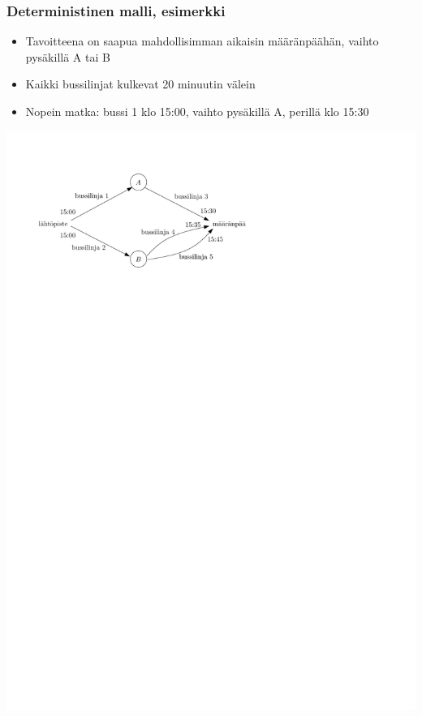 \documentclass{beamer}
\begin{document}
\begin{frame}
  \frametitle{Deterministinen malli, esimerkki} 
  \begin{minipage}[t][0.3\textheight][t]{\textwidth}
  \begin{itemize}
   \item 
Tavoitteena on saapua mahdollisimman aikaisin määränpäähän, vaihto pysäkillä A tai B
\item
Kaikki bussilinjat kulkevat 20 minuutin välein
\item
Nopein matka: bussi 1 klo 15:00, vaihto pysäkillä A, perillä klo 15:30
   \end{itemize}
   \end{minipage}
   \vfill
     \begin{minipage}{\textwidth}
     \begin{center}
     \includegraphics[scale=0.6]{matkansuunnittelu01}
      \end{center}
      \end{minipage}
\end{frame} 
\end{document}
